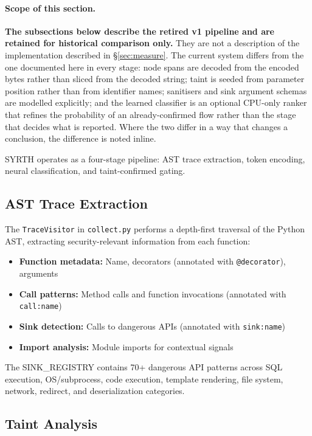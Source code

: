 \documentclass[12pt,a4paper]{article}
\begin{document}
\paragraph{Scope of this section.}
\textbf{The subsections below describe the retired v1 pipeline and are retained for
historical comparison only.} They are not a description of the implementation
described in \S\ref{sec:measure}. The current system differs from the one
documented here in every stage: node spans are decoded from the encoded bytes
rather than sliced from the decoded string; taint is seeded from parameter
position rather than from identifier names; sanitisers and sink argument schemas
are modelled explicitly; and the learned classifier is an optional CPU-only
ranker that refines the probability of an already-confirmed flow rather than the
stage that decides what is reported. Where the two differ in a way that changes a
conclusion, the difference is noted inline.

\medskip

SYRTH operates as a four-stage pipeline: AST trace extraction, token encoding, neural classification, and taint-confirmed gating.

\subsection{AST Trace Extraction}
\label{sec:trace}

The \texttt{TraceVisitor} in \texttt{collect.py} performs a depth-first traversal of the Python AST, extracting security-relevant information from each function:

\begin{itemize}
    \item \textbf{Function metadata:} Name, decorators (annotated with \texttt{@decorator}), arguments
    \item \textbf{Call patterns:} Method calls and function invocations (annotated with \texttt{call:name})
    \item \textbf{Sink detection:} Calls to dangerous APIs (annotated with \texttt{sink:name})
    \item \textbf{Import analysis:} Module imports for contextual signals
\end{itemize}

The SINK\_REGISTRY contains 70+ dangerous API patterns across SQL execution, OS/subprocess, code execution, template rendering, file system, network, redirect, and deserialization categories.

\subsection{Taint Analysis}
\label{sec:taint}
\end{document}
